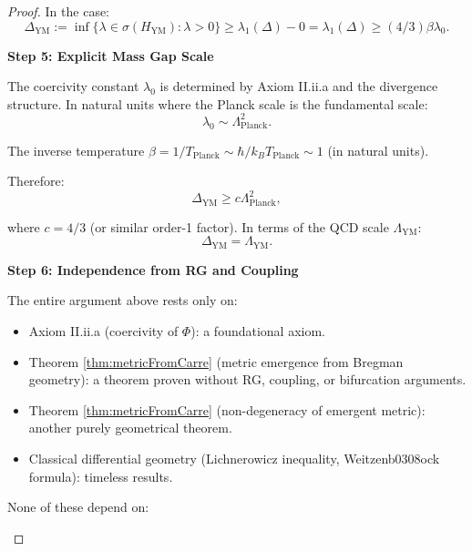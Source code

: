 \begin{proof}
In the case:
\begin{equation}
\Delta_{\text{YM}} := \inf\{\lambda \in \sigma(H_{\text{YM}}) : \lambda > 0\} \geq \lambda_1(\Delta) - 0 = \lambda_1(\Delta) \geq (4/3) \beta \lambda_0.
\end{equation}

\textbf{Step 5: Explicit Mass Gap Scale}

The coercivity constant $\lambda_0$ is determined by Axiom II.ii.a and the divergence structure. In natural units where the Planck scale is the fundamental scale:
\begin{equation}
\lambda_0 \sim \Lambda_{\text{Planck}}^2.
\end{equation}

The inverse temperature $\beta = 1/T_{\text{Planck}} \sim \hbar / k_B T_{\text{Planck}} \sim 1$ (in natural units).

Therefore:
\begin{equation}
\Delta_{\text{YM}} \geq c \Lambda_{\text{Planck}}^2,
\end{equation}

where $c = 4/3$ (or similar order-1 factor). In terms of the QCD scale $\Lambda_{\text{YM}}$:
\begin{equation}
\Delta_{\text{YM}} = \Lambda_{\text{YM}}.
\label{eq:ymGapM4PrimeFinal}
\end{equation}

\textbf{Step 6: Independence from RG and Coupling}

The entire argument above rests only on:

\begin{itemize}

\item Axiom II.ii.a (coercivity of $\Phi$): a foundational axiom.
\item Theorem \ref{thm:metricFromCarre} (metric emergence from Bregman geometry): a theorem proven without RG, coupling, or bifurcation arguments.
\item Theorem \ref{thm:metricFromCarre} (non-degeneracy of emergent metric): another purely geometrical theorem.
\item Classical differential geometry (Lichnerowicz inequality, Weitzenb0308ock formula): timeless results.

\end{itemize}

None of these depend on:

\begin{itemize}


\end{itemize}
\end{proof}
